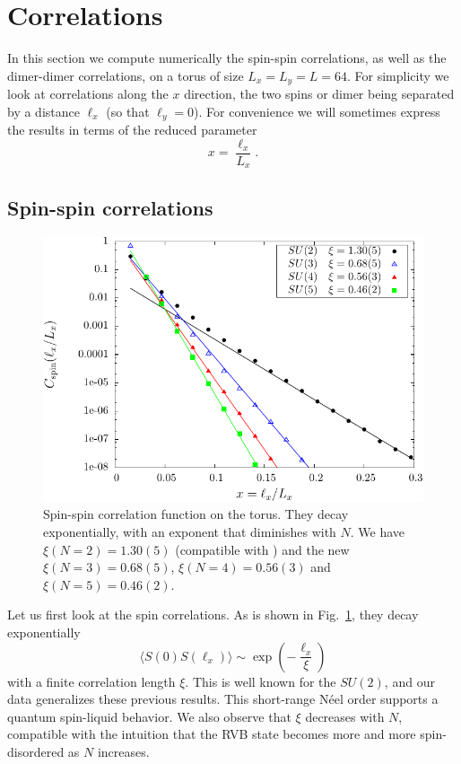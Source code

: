 \documentclass[11pt]{iopart}
\begin{document}
%






 \section{Correlations}
In this section we compute numerically the spin-spin correlations, as well as the dimer-dimer correlations, on a torus of size $L_x=L_y=L=64$. For simplicity we look at correlations along the $x$ direction, the two spins or dimer being separated by a distance $\ell_x$ (so that $\ell_y=0$). For convenience we will sometimes express the results in terms of the reduced parameter
\begin{equation}
 x=\frac{\ell_x}{L_x}.
\end{equation}
\label{sec:correlations}
\subsection{Spin-spin correlations}
\begin{figure}[ht]
 \begin{center}
  \includegraphics{./figures/spin_corr.pdf}
 \end{center}
\caption{Spin-spin correlation function on the torus. They decay exponentially, with an exponent that diminishes with $N$. We have $\xi(N=2)=1.30(5)$ (compatible with \cite{RVB1}) and the new $\xi(N=3)=0.68(5)$, $\xi(N=4)=0.56(3)$ and $\xi(N=5)=0.46(2)$.}
\label{fig:corr_su2}
\end{figure}
Let us first look at the spin correlations. As is shown in Fig.~\ref{fig:corr_su2}, they decay exponentially
\begin{equation}
 \langle S(0)S(\ell_x) \rangle \sim \exp \left(-\frac{\ell_x}{\xi}\right)
\end{equation}
with a finite correlation length $\xi$. This is well known\cite{Doucot,RVB1} for the $SU(2)$, and our data generalizes these previous results. This short-range N\'eel order supports a quantum spin-liquid  behavior. We also observe that $\xi$ decreases with $N$, compatible with the intuition that the RVB state becomes more and more spin-disordered as $N$ increases.
\end{document}
